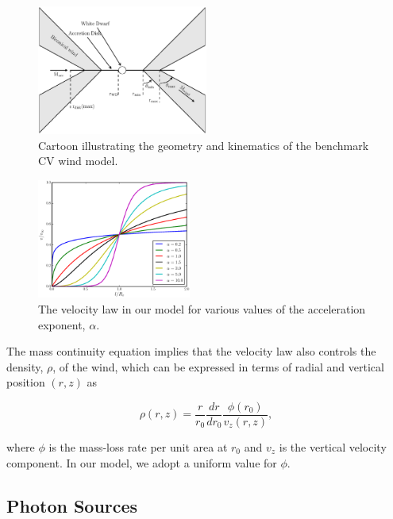 \documentclass[preprint, a4paper, 11pt]{aastex}
\begin{document}
\begin{figure}
\centering
\includegraphics[width=0.5\textwidth]{figures/fig2_cartoon.eps}
\caption{Cartoon illustrating the geometry and kinematics of the benchmark CV wind model.}
\label{cartoon}
\end{figure}


\begin{figure}
\centering
\includegraphics[width=0.45\textwidth]{figures/acc_law.eps}
\caption{
The velocity law in our model for various values of
the acceleration exponent, $\alpha$.
}
\label{acc_law}
\end{figure}



The mass continuity equation implies that the velocity law also 
controls the density, $\rho$, of the wind, which can be expressed in terms
of radial and vertical position $(r,z)$ as 

\begin{equation}
\rho(r,z) = \frac{r}{r_0} \frac{dr}{dr_0} \frac{\phi(r_0)}{v_z(r,z)},
\label{density}
\end{equation}

where $\phi$ is the mass-loss rate per unit area at $r_0$
and $v_z$ is the vertical velocity component. In our model, we
adopt a uniform value for $\phi$. 



\subsection{Photon Sources}
\end{document}
